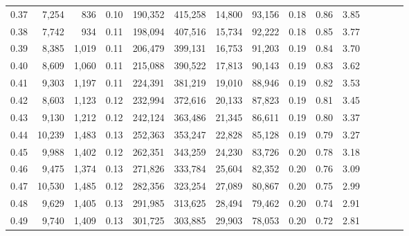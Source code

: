 \begin{tabular}{rrrcrrrrrrrrrrr}
0.37 &   7,254 &    836 &                                       0.10 &  190,352 &  415,258 &   14,800 &   93,156 &  0.18 &  0.86 &                         3.85 \\
0.38 &   7,742 &    934 &                                       0.11 &  198,094 &  407,516 &   15,734 &   92,222 &  0.18 &  0.85 &                         3.77 \\
0.39 &   8,385 &  1,019 &                                       0.11 &  206,479 &  399,131 &   16,753 &   91,203 &  0.19 &  0.84 &                         3.70 \\
0.40 &   8,609 &  1,060 &                                       0.11 &  215,088 &  390,522 &   17,813 &   90,143 &  0.19 &  0.83 &                         3.62 \\
0.41 &   9,303 &  1,197 &                                       0.11 &  224,391 &  381,219 &   19,010 &   88,946 &  0.19 &  0.82 &                         3.53 \\
0.42 &   8,603 &  1,123 &                                       0.12 &  232,994 &  372,616 &   20,133 &   87,823 &  0.19 &  0.81 &                         3.45 \\
0.43 &   9,130 &  1,212 &                                       0.12 &  242,124 &  363,486 &   21,345 &   86,611 &  0.19 &  0.80 &                         3.37 \\
0.44 &  10,239 &  1,483 &                                       0.13 &  252,363 &  353,247 &   22,828 &   85,128 &  0.19 &  0.79 &                         3.27 \\
0.45 &   9,988 &  1,402 &                                       0.12 &  262,351 &  343,259 &   24,230 &   83,726 &  0.20 &  0.78 &                         3.18 \\
0.46 &   9,475 &  1,374 &                                       0.13 &  271,826 &  333,784 &   25,604 &   82,352 &  0.20 &  0.76 &                         3.09 \\
0.47 &  10,530 &  1,485 &                                       0.12 &  282,356 &  323,254 &   27,089 &   80,867 &  0.20 &  0.75 &                         2.99 \\
0.48 &   9,629 &  1,405 &                                       0.13 &  291,985 &  313,625 &   28,494 &   79,462 &  0.20 &  0.74 &                         2.91 \\
0.49 &   9,740 &  1,409 &                                       0.13 &  301,725 &  303,885 &   29,903 &   78,053 &  0.20 &  0.72 &                         2.81 \\

\end{tabular}

